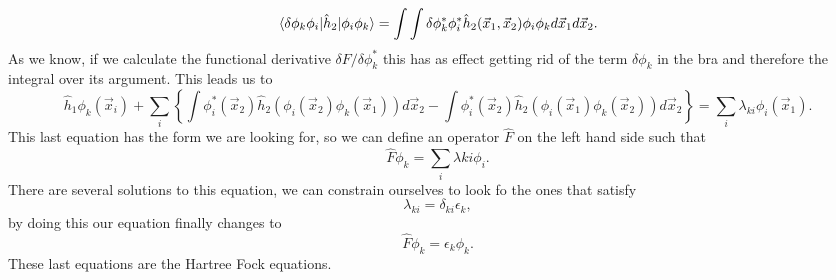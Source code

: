 \begin{questions}
\begin{solution}
  \begin{equation}
    \braket{\delta\phi_k \phi_i | \hat{h}_2|\phi_i \phi_k} = \int \int \delta \phi_k^* \phi_i^* \hat{h}_2(\vec{x}_1, \vec{x}_2)\phi_i \phi_k d\vec{x}_1 d\vec{x}_2.
  \end{equation}
  As we know, if we calculate the functional derivative $\delta F / \delta \phi_k^*$ this has as effect getting rid of the term $\delta\phi_k$ in the bra and therefore the integral over its argument. This leads us to
  \begin{equation}
    \hat{h}_1 \phi_k(\vec{x}_i) + \sum_i \left\{ \int \phi_i^*(\vec{x}_2) \hat{h}_2 (\phi_i(\vec{x}_2)\phi_k(\vec{x}_1)) d\vec{x}_2 - \int \phi_i^*(\vec{x}_2) \hat{h}_2 (\phi_i(\vec{x}_1)\phi_k(\vec{x}_2)) d\vec{x}_2\right\} = \sum_i \lambda_{ki} \phi_i(\vec{x}_1).
  \end{equation}
  This last equation has the form we are looking for, so we can define an operator $\hat{F}$ on the left hand side such that
  \begin{equation}
    \hat{F}\phi_k = \sum_i \lambda{ki} \phi_i.
  \end{equation}
  There are several solutions to this equation, we can constrain ourselves to look fo the ones that satisfy
  \begin{equation}
    \lambda_{ki} = \delta_{ki}\epsilon_k,
  \end{equation}
  by doing this our equation finally changes to
  \begin{equation}
    \hat{F}\phi_k = \epsilon_k \phi_k.
  \end{equation}
  These last equations are the Hartree Fock equations.
 \end{solution}

\end{questions}

%
%
